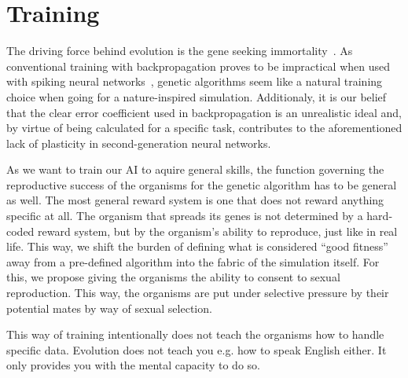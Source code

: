 \section{Training}
The driving force behind evolution is the gene seeking immortality~\cite{Dawkins1976}.
As conventional training with backpropagation proves to be impractical when used with
spiking neural networks~\cite{Paugam-Moisy2012}, genetic algorithms seem like a natural training choice
when going for a nature-inspired simulation. Additionaly, it is our belief that the clear error
coefficient used in backpropagation is an unrealistic ideal and, by virtue of being calculated for
a specific task, contributes to the aforementioned lack of plasticity in second-generation neural networks.

As we want to train our AI to aquire general skills, the function governing the reproductive success of
the organisms for the genetic algorithm has to be general as well. The most general reward system
is one that does not reward anything specific at all. The organism that spreads its 
genes is not determined by a hard-coded reward system, but by the organism's ability to reproduce, 
just like in real life. This way, we shift the burden of defining what is considered ``good fitness''
away from a pre-defined algorithm into the fabric of the simulation itself.
For this, we propose giving the organisms the ability to consent to sexual reproduction.
This way, the organisms are put under selective pressure by their potential mates 
by way of sexual selection.~\cite{Dawkins1982}

This way of training intentionally does not teach the organisms how to handle specific data.
Evolution does not teach you e.g. how to speak English either. It only provides you with the mental
capacity to do so.

